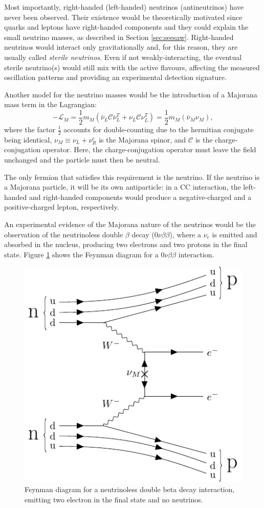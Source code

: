 Most importantly, right-handed (left-handed) neutrinos (antineutrinos) have never been observed. Their existence would be theoretically motivated since quarks and leptons have right-handed components and they could explain the small neutrino masses, as described in Section \ref{sec:seesaw}. Right-handed neutrinos would interact only gravitationally and, for this reason, they are usually called \emph{sterile neutrinos}. Even if not weakly-interacting, the eventual sterile neutrino(s) would still mix with the active flavours, affecting the measured oscillation patterns and providing an experimental detection signature.

Another model for the neutrino masses would be the introduction of a Majorana mass term in the Lagrangian:
\begin{equation}
    -\mathcal{L}_M = \frac{1}{2}m_M(\bar{\nu}_L\mathcal{C}\bar{\nu}^{T}_L+\nu_{L}\mathcal{C}\nu^T_L) = \frac{1}{2}m_M(\bar{\nu}_M\nu_M), \label{eq:majorana}
\end{equation}
where the factor $\frac{1}{2}$ accounts for double-counting due to the hermitian conjugate being identical, $\nu_{M} \equiv \nu_L + \nu^c_R$ is the Majorana spinor, and $\mathcal{C}$ is the charge-conjugation operator. Here, the charge-conjugation operator must leave the field unchanged and the particle must then be neutral.

The only fermion that satisfies this requirement is the neutrino. If the neutrino is a Majorana particle, it will be its own antiparticle: in a CC interaction, the left-handed and right-handed components would produce a negative-charged and a positive-charged lepton, respectively.

An experimental evidence of the Majorana nature of the neutrinos would be the observation of the neutrinoless double $\beta$ decay ($0\nu\beta\beta$), where a $\nu_{e}$ is emitted and absorbed in the nucleus, producing two electrons and two protons in the final state. Figure \ref{fig:0vbb} shows the Feynman diagram for a $0\nu\beta\beta$ interaction. 

\begin{figure}[htbp]
    \centering
    \includegraphics[width=0.55\linewidth]{figures/0vbb.pdf}
    \caption{Feynman diagram for a neutrinoless double beta decay interaction, emitting two electron in the final state and no neutrinos.}
    \label{fig:0vbb}
\end{figure}

